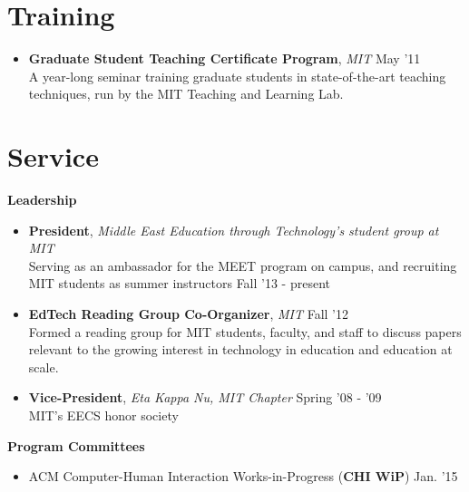 \documentclass[margin]{res}
\begin{document}
\begin{resume}
\section{Training}
\begin{itemize}[leftmargin=*]
\item {\bf Graduate Student Teaching Certificate Program}, {\it MIT} \hfill May '11 \\ A year-long seminar training graduate students in state-of-the-art teaching techniques, run by the MIT Teaching and Learning Lab.
\end{itemize}

\section{Service}
{\bf Leadership}
                \begin{itemize}[leftmargin=*] %
                \item {\bf President}, {\it Middle East Education through Technology's student group at MIT} \\ Serving as an ambassador for the MEET program on campus, and recruiting MIT students as summer instructors \hfill Fall '13 - present
		\item {\bf EdTech Reading Group Co-Organizer}, {\it MIT} \hfill Fall '12 \\ Formed a reading group for MIT students, faculty, and staff to discuss papers relevant to the growing interest in technology in education and education at scale.
                \item {\bf Vice-President}, {\it Eta Kappa Nu, MIT Chapter} \hfill Spring '08 - '09 \\ MIT's EECS honor society 
\end{itemize}

{\bf Program Committees}
 \begin{itemize}[leftmargin=*]
\item ACM Computer-Human Interaction Works-in-Progress ({\bf CHI WiP}) \hfill Jan. '15
\end{itemize}


\end{resume}
\end{document}
